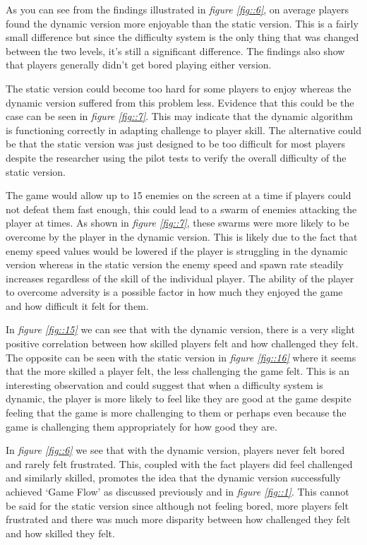 \documentclass[journal]{IEEEtran}
\begin{document}
As you can see from the findings illustrated in \textit{figure \ref{fig::6}}, on average players found the dynamic version more enjoyable than the static version. This is a fairly small difference but since the difficulty system is the only thing that was changed between the two levels, it's still a significant difference. The findings also show that players generally didn't get bored playing either version. 

The static version could become too hard for some players to enjoy whereas the dynamic version suffered from this problem less. Evidence that this could be the case can be seen in \textit{figure \ref{fig::7}}. This may indicate that the dynamic algorithm is functioning correctly in adapting challenge to player skill. The alternative could be that the static version was just designed to be too difficult for most players despite the researcher using the pilot tests to verify the overall difficulty of the static version.

The game would allow up to 15 enemies on the screen at a time if players could not defeat them fast enough, this could lead to a swarm of enemies attacking the player at times. As shown in \textit{figure \ref{fig::7}}, these swarms were more likely to be overcome by the player in the dynamic version. This is likely due to the fact that enemy speed values would be lowered if the player is struggling in the dynamic version whereas in the static version the enemy speed and spawn rate steadily increases regardless of the skill of the individual player. The ability of the player to overcome adversity is a possible factor in how much they enjoyed the game and how difficult it felt for them.

In \textit{figure \ref{fig::15}} we can see that with the dynamic version, there is a very slight positive correlation between how skilled players felt and how challenged they felt. The opposite can be seen with the static version in \textit{figure \ref{fig::16}} where it seems that the more skilled a player felt, the less challenging the game felt. This is an interesting observation and could suggest that when a difficulty system is dynamic, the player is more likely to feel like they are good at the game despite feeling that the game is more challenging to them or perhaps even because the game is challenging them appropriately for how good they are.

In \textit{figure \ref{fig::6}} we see that with the dynamic version, players never felt bored and rarely felt frustrated. This, coupled with the fact players did feel challenged and similarly skilled, promotes the idea that the dynamic version successfully achieved `Game Flow' as discussed previously and in \textit{figure \ref{fig::1}}. This cannot be said for the static version since although not feeling bored, more players felt frustrated and there was much more disparity between how challenged they felt and how skilled they felt. 
\end{document}

